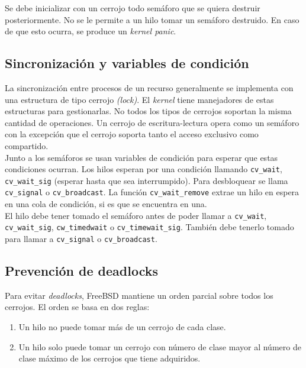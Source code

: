 \documentclass[a4paper]{book}
\begin{document}
Se debe inicializar con un cerrojo todo sem\'aforo que se quiera destruir posteriormente. No se le permite a un hilo tomar un semáforo destruido. En caso de que esto ocurra, se produce un \emph{kernel panic}.

\subsection{Sincronizaci\'on y variables de condici\'on}

La sincronización entre procesos de un recurso generalmente se implementa con una estructura de tipo cerrojo \emph{(lock)}. El \emph{kernel} tiene manejadores de estas estructuras para gestionarlas. No todos los tipos de cerrojos soportan la misma cantidad de operaciones. Un cerrojo de escritura-lectura opera como un semáforo con la excepción que el cerrojo soporta tanto el acceso exclusivo como compartido.\\

Junto a los semáforos se usan variables de condición para esperar que estas condiciones ocurran. Los hilos esperan por una condición llamando \verb|cv_wait|, \verb|cv_wait_sig| (esperar hasta que sea interrumpido). Para desbloquear se llama \verb|cv_signal| o \verb|cv_broadcast|. La función \verb|cv_wait_remove| extrae un hilo en espera en una cola de condición, si es que se encuentra en una.\\

El hilo debe tener tomado el semáforo antes de poder llamar a \verb|cv_wait|, \verb|cv_wait_sig|, \verb|cw_timedwait| o \verb|cv_timewait_sig|. También debe tenerlo tomado para llamar a \verb|cv_signal| o \verb|cv_broadcast|.

\subsection{Prevenci\'on de deadlocks}

Para evitar \emph{deadlocks}, FreeBSD mantiene un orden parcial sobre todos los cerrojos. El orden se basa en dos reglas:
\begin{enumerate}
\item Un hilo no puede tomar más de un cerrojo de cada clase.
\item Un hilo solo puede tomar un cerrojo con número de clase mayor al número de clase máximo de los cerrojos que tiene adquiridos.
\end{enumerate}
\end{document}
